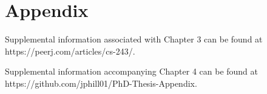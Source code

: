 \linespread{1.0}

\chapter{Appendix}

Supplemental information associated with Chapter 3 can be found at \\ https://peerj.com/articles/cs-243/. 

Supplemental information accompanying Chapter 4 can be found at \\ https://github.com/jphill01/PhD-Thesis-Appendix. 


